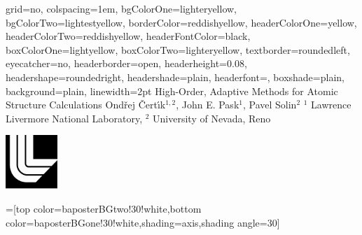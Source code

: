 \documentclass[landscape,final]{baposter}
\begin{document}
\begin{poster}{
  grid=no,
  colspacing=1em,
  bgColorOne=lighteryellow,
  bgColorTwo=lightestyellow,
  borderColor=reddishyellow,
  headerColorOne=yellow,
  headerColorTwo=reddishyellow,
  headerFontColor=black,
  boxColorOne=lightyellow,
  boxColorTwo=lighteryellow,
  textborder=roundedleft,
  eyecatcher=no,
  headerborder=open,
  headerheight=0.08\textheight,
  headershape=roundedright,
  headershade=plain,
  headerfont=\Large\textsf, %
  boxshade=plain,
  background=plain,
  linewidth=2pt
  }
  {} %
  {\sf %
  High-Order, Adaptive Methods for Atomic Structure Calculations}
  {\sf %
  Ond\v rej \v Cert\'\i k$^{1,2}$, John E. Pask$^1$, Pavel Solin$^2$
  \hspace{3em}$^1$ Lawrence Livermore National Laboratory,
  $^2$ University of Nevada, Reno
  }
  {{\begin{minipage}{16em}
    \hfill
    \includegraphics[height=5.5em]{llnl_logo}
  \end{minipage}}
  }

  =[top color=baposterBGtwo!30!white,bottom color=baposterBGone!30!white,shading=axis,shading angle=30]

     \newlength{\leftimgwidth}
     \setlength{\leftimgwidth}{0.78em+8.0em}

    \newcommand{\colouredcircle}[1]{%
      \tikz{\useasboundingbox (-0.2em,-0.32em) rectangle(0.2em,0.32em); \draw[draw=black,fill=baposterBGone!80!black!#1!white,line width=0.03em] (0,0) circle(0.18em);}}


\end{poster}
\end{document}
